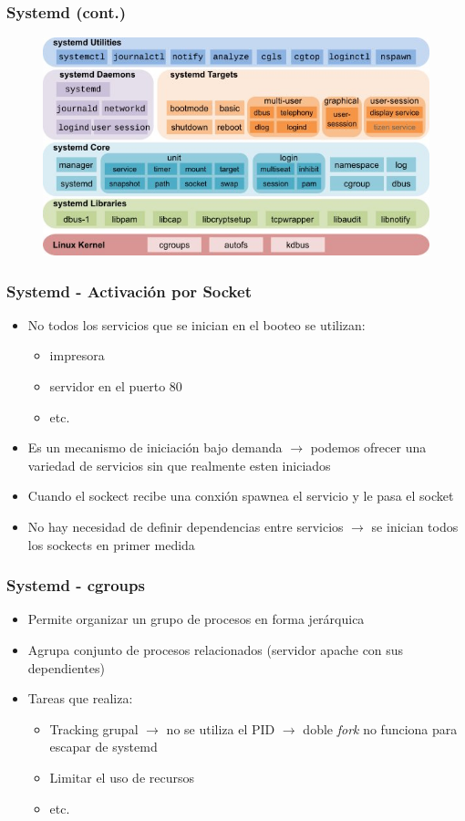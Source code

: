 \begin{frame}
  \frametitle{\textbf{Systemd} (cont.)}
  \begin{figure}
	    \includegraphics[scale=0.5]{images/systemd.jpg}
  \end{figure}
\end{frame}

\begin{frame}
  	\frametitle{\textbf{Systemd} - Activación por Socket}
  	\begin{itemize}
		\item No todos los servicios que se inician en el booteo se utilizan:
		\begin{itemize}
			\item impresora
			\item servidor en el puerto 80
			\item etc.
		\end{itemize}
		\item Es un mecanismo de iniciación bajo demanda $\rightarrow$ podemos ofrecer una variedad de servicios sin que realmente esten iniciados
		\item Cuando el sockect recibe una conxión spawnea el servicio y le pasa el socket
		\item No hay necesidad de definir dependencias entre servicios $\rightarrow$ se inician todos los sockects en primer medida
  	\end{itemize}
\end{frame}

\begin{frame}
  	\frametitle{\textbf{Systemd} - \textbf{cgroups}}
  	\begin{itemize}
		\item Permite organizar un grupo de procesos en forma jerárquica
		\item Agrupa conjunto de procesos relacionados (servidor apache con sus dependientes)
		\item Tareas que realiza:
		\begin{itemize}
			\item Tracking grupal $\rightarrow$ no se utiliza el PID $\rightarrow$ doble \emph{fork} no funciona para escapar de systemd
			\item Limitar el uso de recursos
			\item etc.
		\end{itemize}
  	\end{itemize}
\end{frame}

